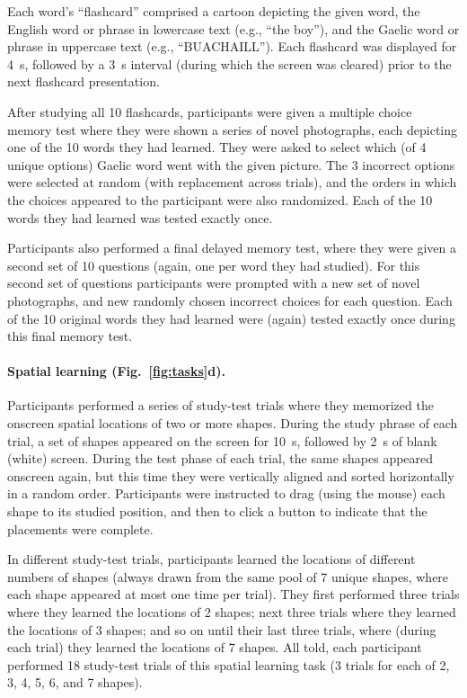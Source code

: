 \documentclass[10pt]{article}
\begin{document}
Each word's ``flashcard'' comprised a cartoon depicting the given
word, the English word or phrase in lowercase text (e.g., ``the
boy''), and the Gaelic word or phrase in uppercase text (e.g.,
``BUACHAILL'').  Each flashcard was displayed for 4~s, followed by a
3~s interval (during which the screen was cleared) prior to the next
flashcard presentation.

After studying all 10 flashcards, participants were given a multiple
choice memory test where they were shown a series of novel
photographs, each depicting one of the 10 words they had learned.
They were asked to select which (of 4 unique options) Gaelic word went
with the given picture.  The 3 incorrect options were selected at
random (with replacement across trials), and the orders in which the
choices appeared to the participant were also randomized.  Each of the
10 words they had learned was tested exactly once.

Participants also performed a final delayed memory test, where they
were given a second set of 10 questions (again, one per word they had
studied).  For this second set of questions participants were prompted
with a new set of novel photographs, and new randomly chosen incorrect
choices for each question.  Each of the 10 original words they had
learned were (again) tested exactly once during this final memory
test.



\paragraph*{Spatial learning (Fig.~\ref{fig:tasks}d).}
Participants performed a series of study-test trials where they
memorized the onscreen spatial locations of two or more shapes.
During the study phrase of each trial, a set of shapes appeared on the
screen for 10~s, followed by 2~s of blank (white) screen.  During the
test phase of each trial, the same shapes appeared onscreen again, but
this time they were vertically aligned and sorted horizontally in a
random order.  Participants were instructed to drag (using the mouse)
each shape to its studied position, and then to click a button to
indicate that the placements were complete.

In different study-test trials, participants learned the locations of
different numbers of shapes (always drawn from the same pool of 7
unique shapes, where each shape appeared at most one time per trial).
They first performed three trials where they learned the locations of
2 shapes; next three trials where they learned the locations of 3
shapes; and so on until their last three trials, where (during each
trial) they learned the locations of 7 shapes.  All told, each
participant performed 18 study-test trials of this spatial learning
task (3 trials for each of 2, 3, 4, 5, 6, and 7 shapes).
\end{document}
